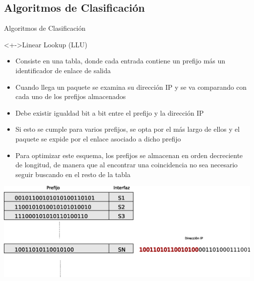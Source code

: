 \documentclass[xcolor=dvipsnames]{beamer}
\begin{document}
\subsection{Algoritmos de Clasificación}
\begin{frame}{Algoritmos de Clasificación}
\begin{block}<+->{Linear Lookup (LLU)}   
    \begin{itemize}
      \scriptsize     	
	\item Consiste en una tabla, donde cada entrada contiene un prefijo más un identificador de enlace de salida
	\item Cuando llega un paquete se examina su dirección IP y se va comparando con cada uno de los prefijos almacenados
	\item Debe existir igualdad bit a bit entre el prefijo y la dirección IP
	\item Si esto se cumple para varios prefijos, se opta por el más largo de ellos y el paquete se expide por el enlace asociado a dicho prefijo
	\item Para optimizar este esquema, los prefijos se almacenan en orden decreciente de longitud, de manera que al encontrar una coincidencia no sea necesario seguir buscando en el resto de la tabla
    \end{itemize}
\centering 
\includegraphics[scale=0.35]{figures/linear.eps}
  \end{block}
\end{frame}
\end{document}

